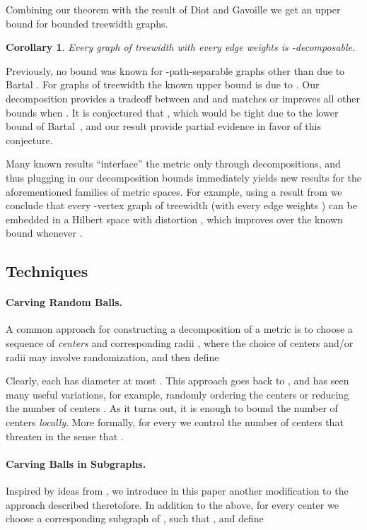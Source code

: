 \documentclass[11pt,fleqn]{article}
\newtheorem{corollary}[theorem]{Corollary}
\begin{document}
Combining our theorem with the result of Diot and Gavoille \cite{DG10} we get an upper bound for bounded treewidth graphs.
\begin{corollary}\label{cor:twToDec}
Every graph  of treewidth  with every edge weights  is -decomposable.
\end{corollary}

Previously, no bound was known for -path-separable graphs other than  due to Bartal \cite{Bartal96}.
For graphs of treewidth  the known upper bound is  due to \cite{AGGNT14}. 
Our decomposition provides a tradeoff between  and  
and matches or improves all other bounds when . 
It is conjectured that , 
which would be tight due to the lower bound of Bartal~\cite{Bartal96},
and our result provide partial evidence in favor of this conjecture.

Many known results ``interface'' the metric only through decompositions, 
and thus plugging in our decomposition bounds immediately yields new results for the aforementioned families of metric spaces.
For example, using a result from \cite{KLMN05} we conclude that 
every -vertex graph of treewidth  (with every edge weights ) 
can be embedded in a Hilbert space with distortion , which improves over the known bound  whenever .

\subsection{Techniques}
\paragraph{Carving Random Balls.} A common approach for constructing a decomposition of a metric  is to choose a sequence of {\em centers}  and corresponding radii , where the choice of centers and/or radii may involve randomization, and then define

Clearly, each  has diameter at most .
This approach goes back to \cite{Bartal96}, and has seen many useful variations, for example, randomly ordering the centers \cite{CKR04} or reducing the number of centers \cite{CKR04,GKL03}.
As it turns out, it is enough to bound the number of centers {\em locally}. More formally, for every  we  control the number of centers  that threaten  in the sense that .

\paragraph{Carving Balls in Subgraphs.} Inspired by ideas from \cite{AGGNT14}, we introduce in this paper another modification to the approach described theretofore. In addition to the above, for every center  we choose a corresponding subgraph  of , such that , and define 
\end{document}
